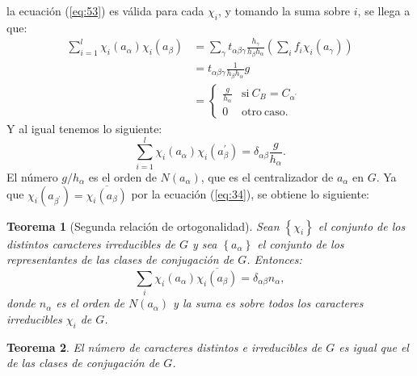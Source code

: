 \documentclass[12pt]{book}
\newtheorem{theorem}{Teorema}[section]
\theoremstyle{definition}
\newcounter{in}
\begin{document}
la ecuación (\ref{eq:53}) es válida para cada $\chi_{i}$, y tomando la suma sobre
$i$, se llega a que:
\begin{equation}
  \label{eq:54}
  \begin{aligned}
    \sum_{i=1}^{l} \chi_{i}(a_{\alpha}) \chi_{i}(a_{\beta}) &= \sum_{\gamma} t_{\alpha \beta \gamma} \frac{h_{\gamma}}{h_{\beta} h_{\alpha}} (\sum_{i} f_{i} \chi_{i}(a_{\gamma})) \\
    &= t_{\alpha \beta \gamma} \frac{1}{h_{\beta} h_{\alpha}}g \\
    &=  \left\{
	       \begin{array}{ll}
		 \frac{g}{h_{\alpha}}      & \mathrm{si\ } C_{B} = C_{\alpha^{'}} \\
		 0      & \mathrm{otro\ caso.\ } 
	       \end{array}
	     \right.
    \end{aligned}
\end{equation}
Y al igual tenemos lo siguiente:
\begin{equation}
  \label{eq:55}
   \sum_{i=1}^{l} \chi_{i}(a_{\alpha}) \chi_{i}(a_{\beta}^{'})=\delta_{\alpha \beta} \frac{g}{h_{\alpha}}.
\end{equation}
El número $g/h_{\alpha}$ es el orden de $N(a_{\alpha})$, que es el
centralizador de $a_{\alpha}$ en $G$. Ya que
$\chi_{i}(a_{\beta^{'}})=\overline{\chi_{i} (a_{\beta})}$ por la ecuación (\ref{eq:34}), se obtiene lo siguiente:
\begin{theorem}[Segunda relación de ortogonalidad]
  \label{t4_9}
  Sean $\left\{\chi_{i} \right\}$ el conjunto de los distintos
  caracteres irreducibles de $G$ y sea $\left\{a_{\alpha} \right\}$ el
  conjunto de los representantes de las clases de conjugación de
  $G$. Entonces:
\begin{equation*}
  \sum_{i} \chi_{i}(a_{\alpha}) \overline{\chi_{i} (a_{\beta})} = \delta_{\alpha \beta} n_{\alpha},
\end{equation*}
donde $n_{\alpha}$ es el orden de $N(a_{\alpha})$ y la suma es sobre
todos los caracteres irreducibles $\chi_{i}$ de $G$.
\end{theorem}
\begin{theorem}
  \label{t4_10}
  El número de caracteres distintos e irreducibles de $G$ es
  igual que el de las clases de conjugación de $G$.
\end{theorem}
\end{document}
